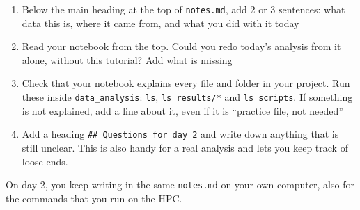 \documentclass[
  letterpaper,
  DIV=11,
  numbers=noendperiod]{scrreprt}
\providecommand{\tightlist}{%
  \setlength{\itemsep}{0pt}\setlength{\parskip}{0pt}}
\begin{document}
\begin{tcolorbox}[enhanced jigsaw, coltitle=black, breakable, titlerule=0mm, colback=white, rightrule=.15mm, bottomrule=.15mm, toprule=.15mm, colframe=quarto-callout-color-frame, colbacktitle=quarto-callout-color!10!white, bottomtitle=1mm, opacitybacktitle=0.6, toptitle=1mm, leftrule=.75mm, arc=.35mm, title=\textcolor{quarto-callout-color}{\faInfo}\hspace{0.5em}{Notebook checkpoint: Tidy your notebook}, left=2mm, opacityback=0]

\begin{enumerate}
\def\labelenumi{\arabic{enumi}.}
\tightlist
\item
  Below the main heading at the top of \texttt{notes.md}, add 2 or 3
  sentences: what data this is, where it came from, and what you did
  with it today
\item
  Read your notebook from the top. Could you redo today's analysis from
  it alone, without this tutorial? Add what is missing
\item
  Check that your notebook explains every file and folder in your
  project. Run these inside \texttt{data\_analysis}: \texttt{ls},
  \texttt{ls\ results/*} and \texttt{ls\ scripts}. If something is not
  explained, add a line about it, even if it is ``practice file, not
  needed''
\item
  Add a heading \texttt{\#\#\ Questions\ for\ day\ 2} and write down
  anything that is still unclear. This is also handy for a real analysis
  and lets you keep track of loose ends.
\end{enumerate}

On day 2, you keep writing in the same \texttt{notes.md} on your own
computer, also for the commands that you run on the HPC.

\end{tcolorbox}
\end{document}
